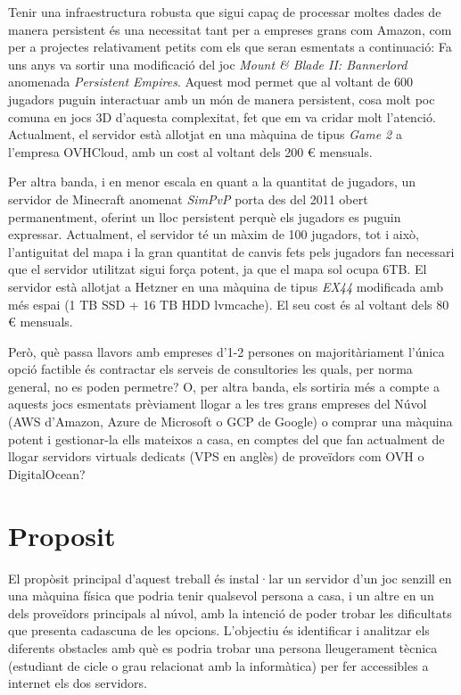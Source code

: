 Tenir una infraestructura robusta que sigui capaç de processar moltes dades de manera persistent és una necessitat tant per a empreses grans com Amazon, com per a projectes relativament petits com els que seran esmentats a continuació: Fa uns anys va sortir una modificació del joc \textit{Mount \& Blade II: Bannerlord} anomenada \textit{Persistent Empires}. Aquest mod permet que al voltant de 600 jugadors puguin interactuar amb un món de manera persistent, cosa molt poc comuna en jocs 3D d'aquesta complexitat, fet que em va cridar molt l'atenció. Actualment, el servidor està allotjat en una màquina de tipus \textit{Game 2} a l'empresa OVHCloud, amb un cost al voltant dels 200 € mensuals.

Per altra banda, i en menor escala en quant a la quantitat de jugadors, un servidor de Minecraft anomenat \textit{SimPvP} porta des del 2011 obert permanentment, oferint un lloc persistent perquè els jugadors es puguin expressar. Actualment, el servidor té un màxim de 100 jugadors, tot i això, l'antiguitat del mapa i la gran quantitat de canvis fets pels jugadors fan necessari que el servidor utilitzat sigui força potent, ja que el mapa sol ocupa 6TB. El servidor està allotjat a Hetzner en una màquina de tipus \textit{EX44} modificada amb més espai (1 TB SSD + 16 TB HDD lvmcache). El seu cost és al voltant dels 80 € mensuals.

Però, què passa llavors amb empreses d'1-2 persones on majoritàriament l'única opció factible és contractar els serveis de consultories les quals, per norma general, no es poden permetre? O, per altra banda, els sortiria més a compte a aquests jocs esmentats prèviament llogar a les tres grans empreses del Núvol (AWS d'Amazon, Azure de Microsoft o GCP de Google) o comprar una màquina potent i gestionar-la ells mateixos a casa, en comptes del que fan actualment de llogar servidors virtuals dedicats (VPS en anglès) de proveïdors com OVH o DigitalOcean?


\section{Proposit}

El propòsit principal d'aquest treball és instal·lar un servidor d'un joc senzill en una màquina física que podria tenir qualsevol persona a casa, i un altre en un dels proveïdors principals al núvol, amb la intenció de poder trobar les dificultats que presenta cadascuna de les opcions. L'objectiu és identificar i analitzar els diferents obstacles amb què es podria trobar una persona lleugerament tècnica (estudiant de cicle o grau relacionat amb la informàtica) per fer accessibles a internet els dos servidors.

